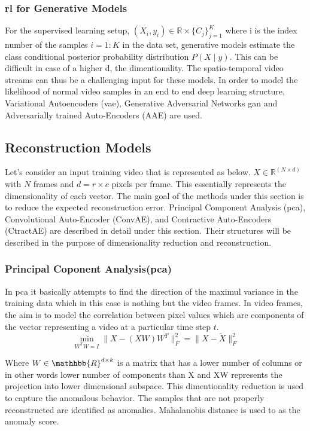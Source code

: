 \documentclass[a4paper,12pt]{report}
\begin{document}
\begin{itemize}
\subsubsection{\gls{rl} for Generative Models}
For the supervised learning setup,  $(X_i,y_i)\in\mathbb{R}\times\{C_j\}_{j=1}^K$ where i is the index number of the samples $i=1:K$ in the data set, generative models estimate the class conditional posterior probability distribution $P(X\mid y)$. This can be difficult in case of a higher d, the dimentionality. The spatio-temporal video streams can thus be a challenging input for these models. 
In order to model the likelihood of normal video samples in an end to end deep learning structure, Variational Autoencoders (\gls{vae}), Generative Adversarial Networks \gls{gan} and Adversarially trained Auto-Encoders (AAE) are used.

\subsection{Reconstruction Models}
Let’s consider an input training video that is represented as below. $X\in \mathbb{R}^{(N \times d)}$ with $N$ frames and $d = r \times c$  pixels per frame. This essentially represents the dimensionality of each vector. The main goal of the methods under this section is to reduce the expected reconstruction error.
Principal Component Analysis (\gls{pca}), Convolutional Auto-Encoder (ConvAE), and Contractive Auto-Encoders (CtractAE) are described in detail under this section. Their structures will be described in the purpose of dimensionality reduction and reconstruction.

\subsubsection{Principal Coponent Analysis(\gls{pca})}
In \gls{pca} it basically attempts to find the direction of the maximul variance in the training data which in this case is nothing but the video frames. In video frames, the aim is to model the correlation between pixel values which are components of the vector representing a video at a particular time step $t$. 
\begin{equation}
        \min_{W^{T}W=I} \| X - (XW)W^T\|_F^2 = \| X - \tilde{X}\|^2_F 
\end{equation}


Where ${W\in\mathhbb{R}^{d\times k}}$ is a matrix that has a lower number of columns or in other words lower number of components than X and XW represents the projection into lower dimensional subspace. This dimentionality reduction is used to capture the anomalous behavior. The samples that are not properly reconstructed are identified as anomalies. Mahalanobis distance is used to as the anomaly score. 


\end{itemize}
\end{document}
